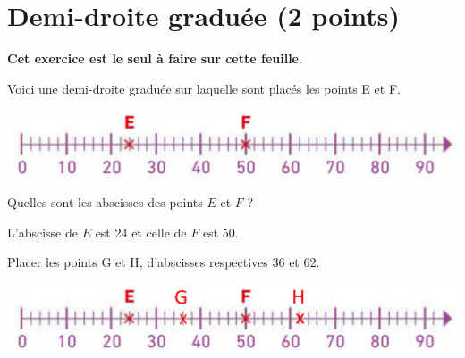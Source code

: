 \section{Demi-droite graduée (2 points)}

{\Large \textbf{Cet exercice est le seul à faire sur cette feuille}.} 

Voici une demi-droite graduée sur laquelle sont placés les points E et F.

\begin{center}
	\includegraphics[scale=0.55]{img/droites2}
\end{center}

\begin{questions}
	\question[1] Quelles sont les abscisses des points $E$ et $F$ ?
	\begin{solution}
		L'abscisse de $E$ est 24 et celle de $F$ est 50.
	\end{solution}
	
	\question[1] Placer les points G et H, d'abscisses respectives 36 et 62.
		\begin{solution}
			\begin{center}
				\includegraphics[scale=0.45]{img/droites2_2}
			\end{center}
		\end{solution}
\end{questions}